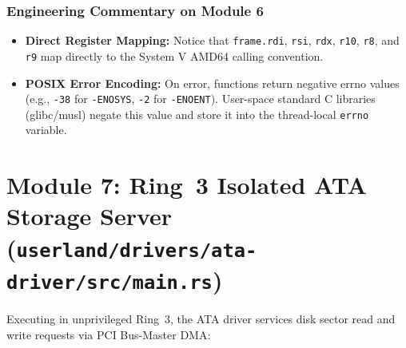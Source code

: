 \subsubsection*{Engineering Commentary on Module 6}
\begin{itemize}
    \item \textbf{Direct Register Mapping:} Notice that \texttt{frame.rdi}, \texttt{rsi}, \texttt{rdx}, \texttt{r10}, \texttt{r8}, and \texttt{r9} map directly to the System V AMD64 calling convention.
    \item \textbf{POSIX Error Encoding:} On error, functions return negative errno values (e.g., \texttt{-38} for \texttt{-ENOSYS}, \texttt{-2} for \texttt{-ENOENT}). User-space standard C libraries (glibc/musl) negate this value and store it into the thread-local \texttt{errno} variable.
\end{itemize}

\section{Module 7: Ring~3 Isolated ATA Storage Server (\texttt{userland/drivers/ata-driver/src/main.rs})}
\label{sec:tour_ata_annotated}

Executing in unprivileged Ring~3, the ATA driver services disk sector read and write requests via PCI Bus-Master DMA:

